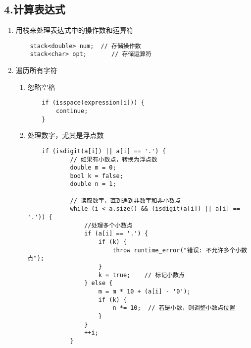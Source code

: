 \documentclass[a4paper]{article}
\begin{document}
\subsection*{4.计算表达式}
\begin{enumerate}
    \item 用栈来处理表达式中的操作数和运算符
    \begin{lstlisting}
    stack<double> num;  // 存储操作数
    stack<char> opt;       // 存储运算符
    \end{lstlisting}
    \item 遍历所有字符
    \begin{enumerate}
        \item 忽略空格
        \begin{lstlisting}
    if (isspace(expression[i])) {
        continue;
    }
        \end{lstlisting}
        \item 处理数字，尤其是浮点数
        \begin{lstlisting}
    if (isdigit(a[i]) || a[i] == '.') {
            // 如果有小数点，转换为浮点数
            double m = 0;
            bool k = false;
            double n = 1;

            // 读取数字，直到遇到非数字和非小数点
            while (i < a.size() && (isdigit(a[i]) || a[i] == '.')) {
                //处理多个小数点
                if (a[i] == '.') {
                    if (k) {
                        throw runtime_error("错误: 不允许多个小数点");
                    }
                    k = true;    // 标记小数点
                } else {
                    m = m * 10 + (a[i] - '0');
                    if (k) {
                        n *= 10;  // 若是小数，则调整小数点位置
                    }
                }
                ++i;
            }


\end{lstlisting}
\end{enumerate}
\end{enumerate}
\end{document}
